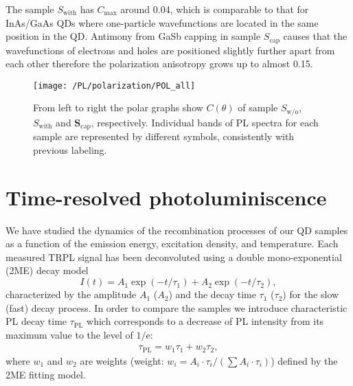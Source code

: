   The sample ${S_\mathrm{with}}$ has $C_\mathrm{max}$ around 0.04, which is comparable to that for InAs/GaAs QDs where one-particle wavefunctions are located in the same position in the QD. Antimony from GaSb capping in sample ${S_\mathrm{cap}}$ causes that the wavefunctions of electrons and holes are positioned slightly further apart from each other therefore the polarization anisotropy grows up to almost 0.15.
  
\begin{figure}
	\centering
	\texttt{[image: /PL/polarization/POL\_all]}
	\caption{From left to right the polar graphs show $C(\theta)$ of sample ${S_\mathrm{w/o}}$, ${S_\mathrm{with}}$ and $\mathbf{S_\mathrm{cap}}$, respectively. Individual bands of PL spectra for each sample are represented by different symbols, consistently with previous labeling.}
	\label{fig:PL_pol_all}
\end{figure}

\newpage
\section{Time-resolved photoluminiscence}
We have studied the dynamics of the recombination processes of our QD samples as a function of the emission energy, excitation density, and temperature. Each measured TRPL signal has been deconvoluted using a double mono-exponential (2ME) decay model
\begin{equation}
I(t)=A_1\exp(-t/\tau_1)+A_2\exp(-t/\tau_2),
\end{equation}
 characterized by the amplitude $A_1$ ($A_2$) and the decay time $\tau_1$ ($\tau_2$) for the slow (fast) decay process. In order to compare the samples we introduce characteristic PL decay time $\tau_\mathrm{PL}$ which corresponds to a decrease of PL intensity from its maximum value to the level of $1/\mathrm{e}$:
%
\begin{eqnarray}
\tau_\mathrm{PL}=w_1\tau_1+w_2\tau_2, \label{eq:average_time}
\end{eqnarray}
%
where $w_1$ and $w_2$ are weights (weight: $w_i={A_i\cdot \tau_i }/{(\sum A_i \cdot \tau_i)}$) defined by the 2ME fitting model.

